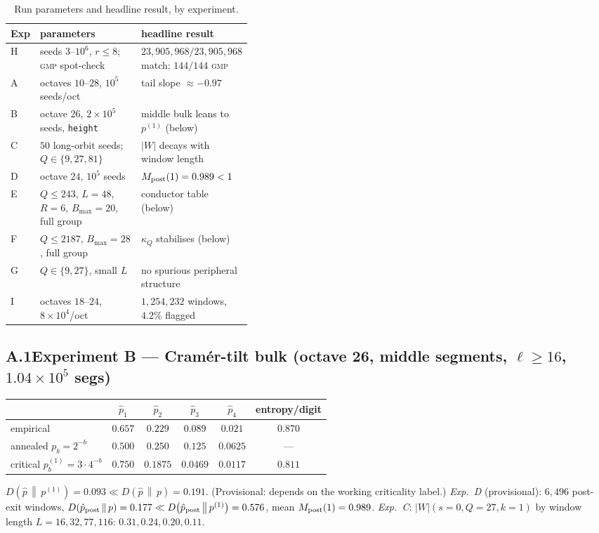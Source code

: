 \documentclass[11pt]{article}
\newcommand{\KL}[2]{D\!\left(#1\,\middle\|\,#2\right)}
\theoremstyle{remark}
\begin{document}
\begin{table}[h]\centering\small
\caption{Run parameters and headline result, by experiment.}\label{tab:runs}
\begin{tabular}{@{}llp{0.40\linewidth}@{}}
\toprule
Exp & parameters & headline result\\
\midrule
H & seeds $3$--$10^6$, $r\le8$; \textsc{gmp} spot-check & $23{,}905{,}968/23{,}905{,}968$ match; $144/144$ \textsc{gmp}\\
A & octaves $10$--$28$, $10^5$ seeds/oct & tail slope $\approx-0.97$\\
B & octave $26$, $2\times10^5$ seeds, \texttt{height} & middle bulk leans to $p^{(1)}$ (below)\\
C & $50$ long-orbit seeds; $Q\in\{9,27,81\}$ & $|W|$ decays with window length\\
D & octave $24$, $10^5$ seeds & $M_{\rm post}(1)=0.989<1$\\
E & $Q\le243$, $L{=}48$, $R{=}6$, $B_{\max}{=}20$, full group & conductor table (below)\\
F & $Q\le2187$, $B_{\max}{=}28$, full group & $\kappa_Q$ stabilises (below)\\
G & $Q\in\{9,27\}$, small $L$ & no spurious peripheral structure\\
I & octaves $18$--$24$, $8\times10^4$/oct & $1{,}254{,}232$ windows, $4.2\%$ flagged\\
\bottomrule
\end{tabular}
\end{table}

\subsection*{A.1\quad Experiment B --- Cram\'er-tilt bulk (octave 26, middle segments, $\ell\ge16$, $1.04\times10^5$ segs)}
\begin{center}\small
\begin{tabular}{@{}lccccc@{}}
\toprule
& $\hat p_1$ & $\hat p_2$ & $\hat p_3$ & $\hat p_4$ & entropy/digit\\
\midrule
empirical & $0.657$ & $0.229$ & $0.089$ & $0.021$ & $0.870$\\
annealed $p_b=2^{-b}$ & $0.500$ & $0.250$ & $0.125$ & $0.0625$ & ---\\
critical $p^{(1)}_b=3\cdot4^{-b}$ & $0.750$ & $0.1875$ & $0.0469$ & $0.0117$ & $0.811$\\
\bottomrule
\end{tabular}
\end{center}
$\KL{\hat p}{p^{(1)}}=0.093\ll\KL{\hat p}{p}=0.191$. (Provisional: depends on the
working criticality label.) \emph{Exp.\ D} (provisional): $6{,}496$ post-exit
windows, $\KL{\hat p_{\rm post}}{p}=0.177\ll\KL{\hat p_{\rm post}}{p^{(1)}}=0.576$,
mean $M_{\rm post}(1)=0.989$. \emph{Exp.\ C}: $|W|(s{=}0,Q{=}27,k{=}1)$ by window
length $L=16,32,77,116$: $0.31,0.24,0.20,0.11$.
\end{document}
